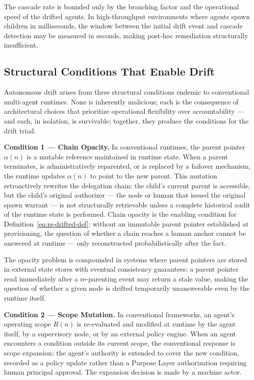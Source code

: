 The cascade rate is bounded only by the branching factor and the operational speed of the drifted agents. In high-throughput environments where agents spawn children in milliseconds, the window between the initial drift event and cascade detection may be measured in seconds, making post-hoc remediation structurally insufficient.

\subsection{Structural Conditions That Enable Drift}
\label{sec:rs-drift-conditions}

Autonomous drift arises from three structural conditions endemic to conventional multi-agent runtimes. None is inherently malicious; each is the consequence of architectural choices that prioritize operational flexibility over accountability — and each, in isolation, is survivable; together, they produce the conditions for the drift triad.

\medskip
\noindent\textbf{Condition 1 — Chain Opacity.}
In conventional runtimes, the parent pointer $\alpha(n)$ is a mutable reference maintained in runtime state. When a parent terminates, is administratively reparented, or is replaced by a failover mechanism, the runtime updates $\alpha(n)$ to point to the new parent. This mutation retroactively rewrites the delegation chain: the child's current parent is accessible, but the child's original authorizer — the node or human that issued the original spawn warrant — is not structurally retrievable unless a complete historical audit of the runtime state is performed. Chain opacity is the enabling condition for Definition~\ref{eq:rs-drifted-def}: without an immutable parent pointer established at provisioning, the question of whether a chain reaches a human anchor cannot be answered at runtime — only reconstructed probabilistically after the fact.

The opacity problem is compounded in systems where parent pointers are stored in external state stores with eventual consistency guarantees: a parent pointer read immediately after a re-parenting event may return a stale value, making the question of whether a given node is drifted temporarily unanswerable even by the runtime itself.

\medskip
\noindent\textbf{Condition 2 — Scope Mutation.}
In conventional frameworks, an agent's operating scope $R(n)$ is re-evaluated and modified at runtime by the agent itself, by a supervisory node, or by an external policy engine. When an agent encounters a condition outside its current scope, the conventional response is scope expansion: the agent's authority is extended to cover the new condition, recorded as a policy update rather than a Purpose Layer authorization requiring human principal approval. The expansion decision is made by a machine actor.

